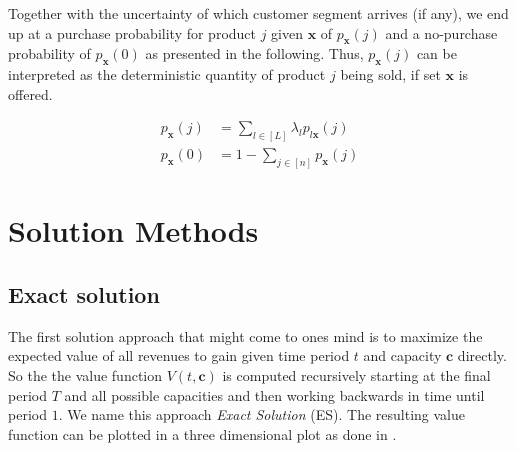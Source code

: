 Together with the uncertainty of which customer segment arrives (if any), we end up at a purchase probability for product $j$ given $\boldsymbol{x}$ of $p_{\boldsymbol{x}}(j)$ and a no-purchase probability of $p_{\boldsymbol{x}}(0)$ as presented in the following. Thus, $p_{\boldsymbol{x}}(j)$ can be interpreted as the deterministic quantity of product $j$ being sold, if set $\boldsymbol{x}$ is offered.

\begin{align}
	p_{\boldsymbol{x}}(j) &= \sum_{l \in [L]} \lambda_l p_{l\boldsymbol{x}}(j)\\
	p_{\boldsymbol{x}}(0) &= 1-\sum_{j\in[n]}p_{\boldsymbol{x}}(j)
\end{align}
 

\section{Solution Methods}\label{s:Metho}



\subsection{Exact solution}

The first solution approach that might come to ones mind is to maximize the expected value of all revenues to gain given time period $t$ and capacity $\boldsymbol{c}$ directly. So the the value function $V(t, \boldsymbol{c})$ is computed recursively starting at the final period $T$ and all possible capacities and then working backwards in time until period $1$. We name this approach \emph{Exact Solution} (ES).
The resulting value function can be plotted in a three dimensional plot as done in .

